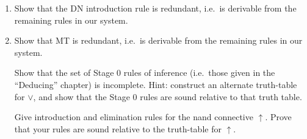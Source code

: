 





\begin{exercises} \mbox{}
  \begin{enumerate}
  \sitem Let $T$ stand for the system of propositional logic with
  connectives $\neg ,\wedge$, and with rules $\wedge$I, $\wedge$E,
  RAA, and DN.  We write $\succ\phi$ to indicate that $\phi$ is
  provable in system $T$.  Either prove or refute the following
  statement: for a sentence $\phi$ that contains only $\neg$ and
  $\wedge$, if $\vdash\phi$ then $\succ\phi$.

  \sitem In this exercise, you're asked to show that the RAA rule is
  redundant.  Let $T$ stand for the system of propositional logic that
  results from dropping the RAA rule, and write $\phi\succ\psi$ to
  indicate that the corresponding sequent is provable in system $T$.
  Show that if $\phi\vdash\psi$ then $\phi\succ\psi$.  (Hint: prove
  that $P\to \neg P\succ\neg P$.)

\item Show that the DN introduction rule is redundant, i.e.\ is
  derivable from the remaining rules in our system.

\item Show that MT is redundant, i.e.\ is derivable from the
  remaining rules in our system.

  \sitem Show that the set of Stage $0$ rules of inference (i.e.\
  those given in the ``Deducing'' chapter) is incomplete.  Hint:
  construct an alternate truth-table for $\vee$, and show that the
  Stage $0$ rules are sound relative to that truth table.

\sitem Give introduction and elimination rules for the nand
  connective $\uparrow$.  Prove that your rules are sound relative to
  the truth-table for $\uparrow$.

\end{enumerate} \end{exercises}






